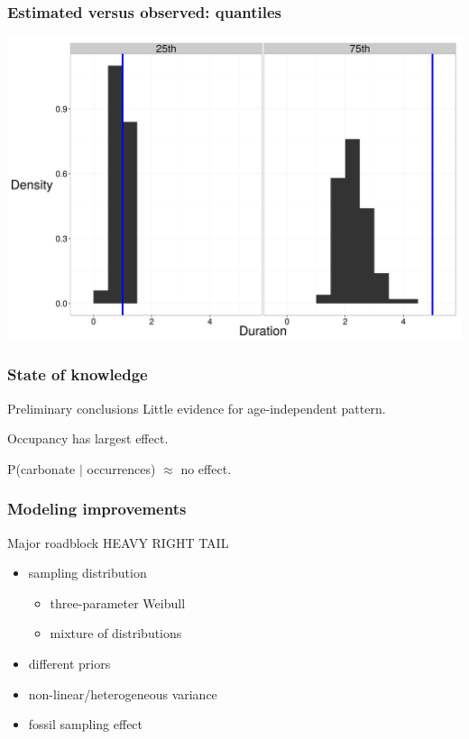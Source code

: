 \documentclass{beamer}
\begin{document}
\begin{frame}
  \frametitle{Estimated versus observed: quantiles}
  \begin{center}
    \includegraphics[height = 0.8\textheight, width = \textwidth, keepaspectratio = true]{figure/wei_quant_ppc}
  \end{center}
\end{frame}

\begin{frame}
  \frametitle{State of knowledge}

  \begin{block}{Preliminary conclusions}
    Little evidence for age-independent pattern.

    Occupancy has largest effect. 
    
    P(carbonate \(\mid\) occurrences) \(\approx\) no effect.
  \end{block}
\end{frame}

\begin{frame}
  \frametitle{Modeling improvements}

  \begin{alertblock}{Major roadblock}
    \alert{\uppercase{heavy right tail}}
  \end{alertblock}

  \bigskip

  \begin{itemize}
    \item sampling distribution
      \begin{itemize}
        \item three-parameter Weibull
        \item mixture of distributions
      \end{itemize}
    \item different priors
    \item non-linear/heterogeneous variance
    \item fossil sampling effect
  \end{itemize}
\end{frame}
\end{document}
